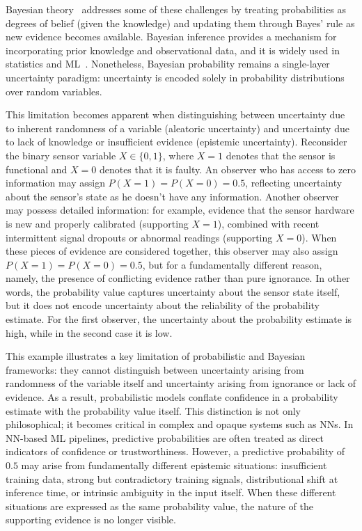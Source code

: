 Bayesian theory~\cite{gelman2013bayesian,jaynes03,Bernardo:1319894} addresses some of these challenges by treating probabilities as degrees of belief (given the knowledge) and updating them through Bayes’ rule as new evidence becomes available. Bayesian inference provides a mechanism for incorporating prior knowledge and observational data, and it is widely used in statistics and \ac{ML}~\cite{barberBRML2011}. Nonetheless, Bayesian probability remains a single-layer uncertainty paradigm: uncertainty is encoded solely in probability distributions over random variables.

This limitation becomes apparent when distinguishing between uncertainty due to inherent randomness of a variable (aleatoric uncertainty) and uncertainty due to lack of knowledge or insufficient evidence (epistemic uncertainty). Reconsider the binary sensor variable $X \in \{0,1\}$, where $X=1$ denotes that the sensor is functional and $X=0$ denotes that it is faulty. An observer who has access to zero information may assign $P(X=1) = P(X=0) =0.5$, reflecting uncertainty about the sensor’s state as he doesn't have any information. Another observer may possess detailed information: for example, evidence that the sensor hardware is new and properly calibrated (supporting $X=1$), combined with recent intermittent signal dropouts or abnormal readings (supporting $X=0$). When these pieces of evidence are considered together, this observer may also assign $P(X=1)=P(X=0)=0.5$, but for a fundamentally different reason, namely, the presence of conflicting evidence rather than pure ignorance. In other words, the probability value captures uncertainty about the sensor state itself, but it does not encode uncertainty about the reliability of the probability estimate. For the first observer, the uncertainty about the probability estimate is high, while in the second case it is low. 

This example illustrates a key limitation of probabilistic and Bayesian frameworks: they cannot distinguish between uncertainty arising from randomness of the variable itself and uncertainty arising from ignorance or lack of evidence. As a result, probabilistic models conflate confidence in a probability estimate with the probability value itself. This distinction is not only philosophical; it becomes critical in complex and opaque systems such as \acfp{NN}. In \ac{NN}-based \ac{ML} pipelines, predictive probabilities are often treated as direct indicators of confidence or trustworthiness. However, a predictive probability of $0.5$ may arise from fundamentally different epistemic situations: insufficient training data, strong but contradictory training signals, distributional shift at inference time, or intrinsic ambiguity in the input itself. When these different situations are expressed as the same probability value, the nature of the supporting evidence is no longer visible.

